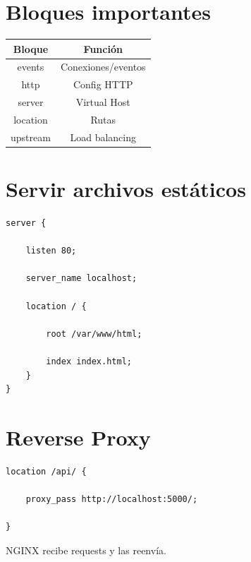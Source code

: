 \documentclass[a4paper,11pt]{article}
\begin{document}

\section*{Bloques importantes}

\begin{center}
\begin{tabular}{| c | c |}
\hline
Bloque & Función \\
\hline\hline
events & Conexiones/eventos \\
\hline
http & Config HTTP \\
\hline
server & Virtual Host \\
\hline
location & Rutas \\
\hline
upstream & Load balancing \\
\hline
\end{tabular}
\end{center}


\section*{Servir archivos estáticos}

\begin{lstlisting}
server {

    listen 80;

    server_name localhost;

    location / {

        root /var/www/html;

        index index.html;
    }
}
\end{lstlisting}


\section*{Reverse Proxy}

\begin{lstlisting}
location /api/ {

    proxy_pass http://localhost:5000/;

}
\end{lstlisting}

NGINX recibe requests y las reenvía.

\end{document}
